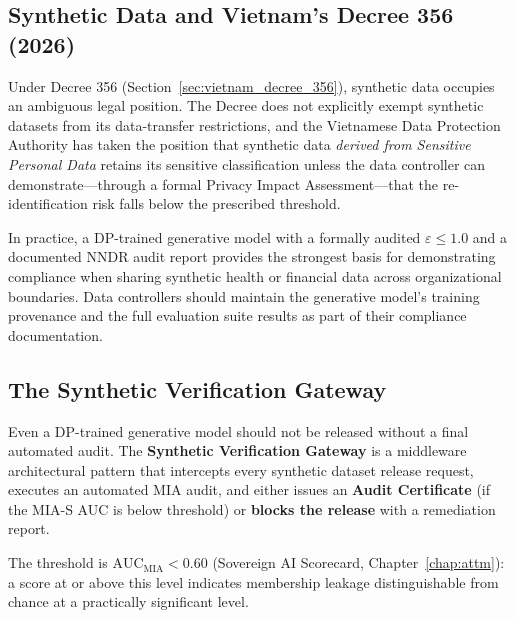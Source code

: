 \subsection{Synthetic Data and Vietnam's Decree 356 (2026)}
\label{subsec:synth-decree356}

Under Decree 356 (Section~\ref{sec:vietnam_decree_356}), synthetic
data occupies an ambiguous legal position.
The Decree does not explicitly exempt synthetic datasets from its
data-transfer restrictions, and the Vietnamese Data Protection
Authority has taken the position that synthetic data \emph{derived
from Sensitive Personal Data} retains its sensitive classification
unless the data controller can demonstrate---through a formal Privacy
Impact Assessment---that the re-identification risk falls below the
prescribed threshold.

In practice, a DP-trained generative model with a formally audited
$\varepsilon \leq 1.0$ and a documented NNDR audit report provides
the strongest basis for demonstrating compliance when sharing
synthetic health or financial data across organizational boundaries.
Data controllers should maintain the generative model's training
provenance and the full evaluation
suite results as part of their compliance documentation.

\subsection{The Synthetic Verification Gateway}
\label{subsec:synth-verification-gateway}

Even a DP-trained generative model should not be released without a final automated audit. The \textbf{Synthetic Verification Gateway} is a middleware architectural pattern that intercepts every synthetic dataset release request, executes an automated MIA audit, and either issues an \textbf{Audit Certificate} (if the MIA-S AUC is below threshold) or \textbf{blocks the release} with a remediation report.

The threshold is $\text{AUC}_{\text{MIA}} < 0.60$ (Sovereign AI Scorecard, Chapter~\ref{chap:attm}): a score at or above this level indicates membership leakage distinguishable from chance at a practically significant level.


